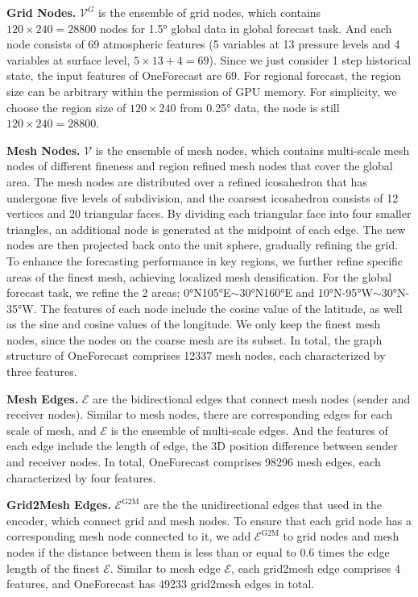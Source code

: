\textbf{Grid Nodes.}  $\mathcal{V}^G$ is the ensemble of grid nodes, which contains $120\times240=28800$ nodes for 1.5° global data in global forecast task. And each node consists of 69 atmospheric features (5 variables at 13 pressure levels and 4 variables at surface level, $5\times13+4=69$). Since we just consider 1 step historical state, the input features of OneForecast are 69. For regional forecast, the region size can be arbitrary within the permission of GPU memory. For simplicity, we choose the region size of $120\times240$ from 0.25° data, the node is still $120\times240=28800$.

\textbf{Mesh Nodes.}  $\mathcal{V}$ is the ensemble of mesh nodes, which contains multi-scale mesh nodes of different fineness and region refined mesh nodes that cover the global area. The mesh nodes are distributed over a refined icosahedron that has undergone five levels of subdivision, and the coarsest icosahedron consists of 12 vertices and 20 triangular faces. By dividing each triangular face into four smaller triangles, an additional node is generated at the midpoint of each edge. The new nodes are then projected back onto the unit sphere, gradually refining the grid. To enhance the forecasting performance in key regions, we further refine specific areas of the finest mesh, achieving localized mesh densification. For the global forecast task, we refine the 2 areas: 0°N105°E$\sim$30°N160°E and 10°N-95°W$\sim$30°N-35°W. The features of each node include the cosine value of the latitude, as well as the sine and cosine values of the longitude. We only keep the finest mesh nodes, since the nodes on the coarse mesh are its subset. In total, the graph structure of OneForecast comprises 12337 mesh nodes, each characterized by three features. 

\textbf{Mesh Edges.} $\mathcal{E}$ are the bidirectional edges that connect mesh nodes (sender and receiver nodes). Similar to mesh nodes, there are corresponding edges for each scale of mesh, and $\mathcal{E}$ is the ensemble of multi-scale edges. And the features of each edge include the length of edge, the 3D position difference between sender and receiver nodes. In total, OneForecast comprises 98296 mesh edges, each characterized by four features.

\textbf{Grid2Mesh Edges.} $\mathcal{E}^{\mathrm{G} 2 \mathrm{M}}$ are the the unidirectional edges that used in the encoder, which connect grid and mesh nodes. To ensure that each grid node has a corresponding mesh node connected to it, we add $\mathcal{E}^{\mathrm{G} 2 \mathrm{M}}$ to grid nodes and mesh nodes if the distance between them is less than or equal to 0.6 times the edge length of the finest $\mathcal{E}$. Similar to mesh edge $\mathcal{E}$, each grid2mesh edge comprises 4 features, and OneForecast has 49233 grid2mesh edges in total.

